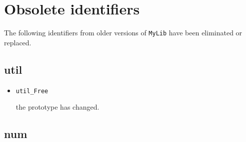 

\section{Obsolete identifiers}

The following identifiers from older versions of {\tt MyLib}
have been eliminated or replaced.





\subsection{util}

\begin{itemize}

\item {\tt util\_Free}

the prototype has changed.

\end{itemize}



\subsection{num}

